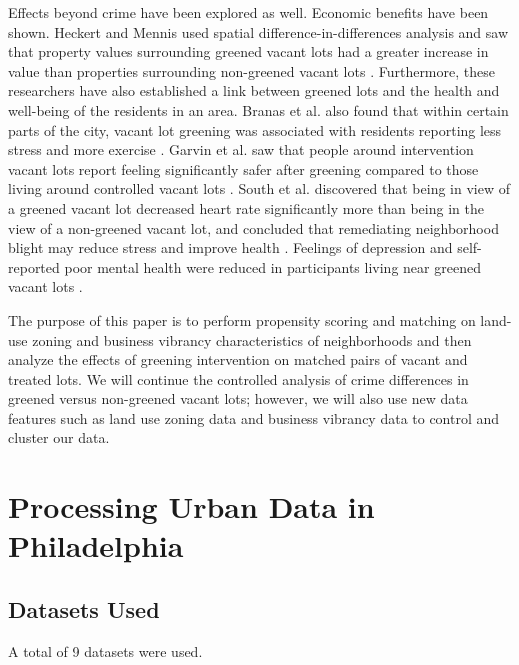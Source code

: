 \documentclass{article}
\begin{document}
Effects beyond crime have been explored as well. Economic benefits have been shown. Heckert and Mennis used spatial difference-in-differences analysis and saw that property values surrounding greened vacant lots had a greater increase in value than properties surrounding non-greened vacant lots \cite{heckert_mennis-1}. Furthermore, these researchers have also established a link between greened lots and the health and well-being of the residents in an area. Branas et al. also found that within certain parts of the city, vacant lot greening was associated with residents reporting less stress and more exercise \cite{branas-1}. Garvin et al. saw that people around intervention vacant lots report feeling significantly safer after greening compared to those living around controlled vacant lots \cite{garvin-1}. South et al. discovered that being in view of a greened vacant lot decreased heart rate significantly more than being in the view of a non-greened vacant lot, and concluded that remediating neighborhood blight may reduce stress and improve health \cite{south-1}. Feelings of depression and self-reported poor mental health were reduced in participants living near greened vacant lots \cite{south-2}. 

The purpose of this paper is to perform propensity scoring and matching on land-use zoning and business vibrancy characteristics of neighborhoods and then analyze the effects of greening intervention on matched pairs of vacant and treated lots. We will continue the controlled analysis of crime differences in greened versus non-greened vacant lots; however, we will also use new data features such as land use zoning data and business vibrancy data to control and cluster our data.

\section{Processing Urban Data in Philadelphia}
\subsection{Datasets Used}

A total of 9 datasets were used.
\end{document}
